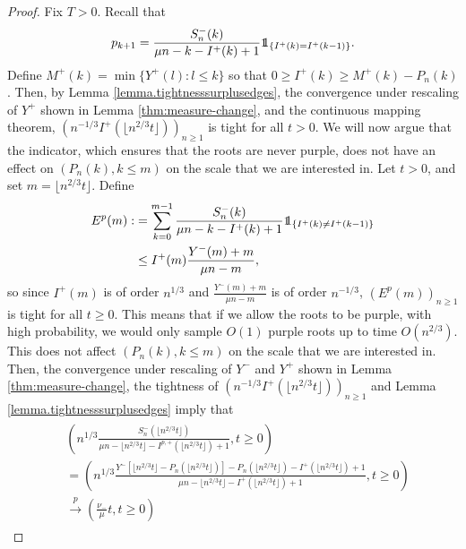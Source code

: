 \begin{proof}
Fix $T>0$. Recall that
$$p_{k+1}=\frac{S_n^{-}(k)}{\mu n - k -I^{+}(k)+1}\one_{\{I^{+}(k)=I^{+}(k-1)\}}.$$
Define $M^+(k)=\min\{Y^+(l):l\leq k\}$ so that $0\geq I^{+}(k)\geq M^+(k)-P_n(k)$.  Then, by Lemma \ref{lemma.tightnesssurplusedges}, the convergence under rescaling of $Y^+$ shown in Lemma \ref{thm:measure-change}, and the continuous mapping theorem, $\left(n^{-1/3}I^+(\lfloor n^{2/3} t \rfloor)\right)_{n\geq 1}$ is tight for all $t>0$.
We will now argue that the indicator, which ensures that the roots are never purple, does not have an effect on $(P_n(k),k\leq m)$ on the scale that we are interested in. Let $t>0$, and set $m=\lfloor n^{2/3}t\rfloor$. Define
\begin{align*}\begin{split}
E^p(m):&=\sum_{k=0}^{m-1}\frac{S_n^{-}(k)}{\mu n - k -I^{+}(k)+1}\one_{\{I^{+}(k)\neq I^{+}(k-1)\}}\\
&\leq I^{+}(m) \frac{Y^-(m)+m}{\mu n - m},\end{split}\end{align*}
so since $I^{+}(m)$ is of order $n^{1/3}$ and $\frac{Y^{-}(m)+m}{\mu n - m}$ is of order $n^{-1/3}$, $(E^p(m))_{n\geq 1}$ is tight for all $t\geq 0$.  This means that if we allow the roots to be purple, with high probability, we would only sample $O(1)$ purple roots up to time $O(n^{2/3})$. This does not affect $(P_n(k),k\leq m)$ on the scale that we are interested in. \\
 Then, the convergence under rescaling of $Y^-$ and $Y^+$ shown in Lemma \ref{thm:measure-change}, the tightness of $\left(n^{-1/3}I^{+}(\lfloor n^{2/3} t \rfloor)\right)_{n\geq 1}$ and Lemma \ref{lemma.tightnesssurplusedges} imply that
\begin{align}\begin{split}\label{eq.convergenceprob}
  &\left(n^{1/3}\frac{S_n^{-}\left(\lfloor n^{2/3} t \rfloor\right)}{\mu n - \lfloor n^{2/3} t \rfloor -I^{p,+}\left(\lfloor n^{2/3} t \rfloor\right)+1},t\geq 0\right)\\
 &=\left(n^{1/3}\frac{Y^-\left[\lfloor n^{2/3} t \rfloor-P_n\left(\lfloor n^{2/3} t \rfloor\right)\right]-P_n\left(\lfloor n^{2/3} t \rfloor\right)-I^{+}\left(\lfloor n^{2/3} t \rfloor\right)+1}{\mu n - \lfloor n^{2/3} t \rfloor -I^{+}\left(\lfloor n^{2/3} t \rfloor\right)+1},t\geq 0\right)\\
 &\overset{p}{\to} \left(\frac{\nu_-}{\mu}t,t\geq 0\right)\end{split}\end{align}

\end{proof}
